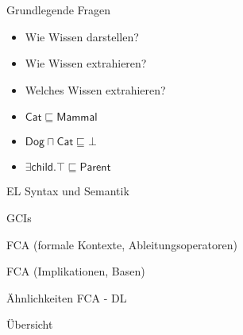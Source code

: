 \documentclass[ngerman]{beamer}
\begin{document}
\begin{frame}[label=current]


  \begin{block}{Grundlegende Fragen}
    \begin{itemize}
    \item<2-> Wie Wissen darstellen? 
    \item<3-> Wie Wissen extrahieren? 
    \item<4-> Welches Wissen extrahieren? 
    \end{itemize}
  \end{block}


  \begin{Beispiel}
    \begin{itemize}
    \item<7-> $\mathsf{Cat} \sqsubseteq \mathsf{Mammal}$
    \item<8-> $\mathsf{Dog} \sqcap \mathsf{Cat} \sqsubseteq \bot$
    \item<9-> $\exists \mathsf{child}. \top \sqsubseteq \mathsf{Parent}$
    \end{itemize}
  \end{Beispiel}

\end{frame}

\begin{frame}
  EL Syntax und Semantik
\end{frame}

\begin{frame}
  GCIs
\end{frame}

\begin{frame}
  FCA (formale Kontexte, Ableitungsoperatoren)
\end{frame}

\begin{frame}
  FCA (Implikationen, Basen)
\end{frame}

\begin{frame}
  Ähnlichkeiten FCA - DL
\end{frame}

\begin{frame}
  Übersicht
\end{frame}
\end{document}
